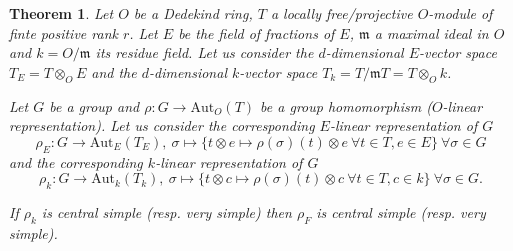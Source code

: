 \documentclass[12pt,a4paper,reqno]{amsart}
\def\Aut{\mathrm{Aut}}
\newtheorem{thm}{Theorem}[section]
\theoremstyle{definition}
\begin{document}
\begin{thm}
\label{deformation}
Let $O$ be a Dedekind ring,  $T$ a locally free/projective $O$-module of finte positive rank $r$. Let $E$ be the field of fractions
of $E$, $\mathfrak{m}$ a maximal ideal in $O$ and $k=O/\mathfrak{m}$ its residue field. Let us consider the $d$-dimensional $E$-vector space
$T_E=T\otimes_O E$ and  the $d$-dimensional $k$-vector space
$T_{k}=T/\mathfrak{m}T=T\otimes_O k$.


Let $G$ be a group and
$\rho:G \to \Aut_{O}(T)$ be a group homomorphism ($O$-linear representation). Let us consider the corresponding $E$-linear representation of $G$
$$\rho_E: G \to \Aut_E(T_E),  \  \sigma \mapsto \{ t\otimes e \mapsto \rho(\sigma)(t)\otimes e \ \forall t\in T,e\in E\} \ \forall \sigma\in G$$
and the corresponding $k$-linear representation of $G$
$$\rho_{k}: G \to \Aut_{k}(T_k),  \  \sigma \mapsto \{ t\otimes c \mapsto \rho(\sigma)(t)\otimes c \ \forall t\in T, c \in k\} \ \forall \sigma\in G.$$

If $\rho_{k}$ is central simple (resp. very simple) then $\rho_F$ is  central simple (resp. very simple).

\end{thm}
\end{document}
